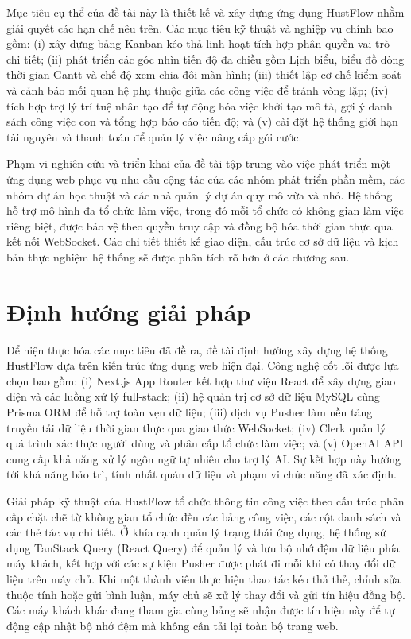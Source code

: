 \documentclass[../DoAn.tex]{subfiles}
\begin{document}
Mục tiêu cụ thể của đề tài này là thiết kế và xây dựng ứng dụng HustFlow nhằm giải quyết các hạn chế nêu trên. Các mục tiêu kỹ thuật và nghiệp vụ chính bao gồm: (i) xây dựng bảng Kanban kéo thả linh hoạt tích hợp phân quyền vai trò chi tiết; (ii) phát triển các góc nhìn tiến độ đa chiều gồm Lịch biểu, biểu đồ dòng thời gian Gantt và chế độ xem chia đôi màn hình; (iii) thiết lập cơ chế kiểm soát và cảnh báo mối quan hệ phụ thuộc giữa các công việc để tránh vòng lặp; (iv) tích hợp trợ lý trí tuệ nhân tạo để tự động hóa việc khởi tạo mô tả, gợi ý danh sách công việc con và tổng hợp báo cáo tiến độ; và (v) cài đặt hệ thống giới hạn tài nguyên và thanh toán để quản lý việc nâng cấp gói cước.

Phạm vi nghiên cứu và triển khai của đề tài tập trung vào việc phát triển một ứng dụng web phục vụ nhu cầu cộng tác của các nhóm phát triển phần mềm, các nhóm dự án học thuật và các nhà quản lý dự án quy mô vừa và nhỏ. Hệ thống hỗ trợ mô hình đa tổ chức làm việc, trong đó mỗi tổ chức có không gian làm việc riêng biệt, được bảo vệ theo quyền truy cập và đồng bộ hóa thời gian thực qua kết nối WebSocket. Các chi tiết thiết kế giao diện, cấu trúc cơ sở dữ liệu và kịch bản thực nghiệm hệ thống sẽ được phân tích rõ hơn ở các chương sau.

\section{Định hướng giải pháp}
\label{section:1.3}

Để hiện thực hóa các mục tiêu đã đề ra, đề tài định hướng xây dựng hệ thống HustFlow dựa trên kiến trúc ứng dụng web hiện đại. Công nghệ cốt lõi được lựa chọn bao gồm: (i) Next.js App Router kết hợp thư viện React để xây dựng giao diện và các luồng xử lý full-stack; (ii) hệ quản trị cơ sở dữ liệu MySQL cùng Prisma ORM để hỗ trợ toàn vẹn dữ liệu; (iii) dịch vụ Pusher làm nền tảng truyền tải dữ liệu thời gian thực qua giao thức WebSocket; (iv) Clerk quản lý quá trình xác thực người dùng và phân cấp tổ chức làm việc; và (v) OpenAI API cung cấp khả năng xử lý ngôn ngữ tự nhiên cho trợ lý AI. Sự kết hợp này hướng tới khả năng bảo trì, tính nhất quán dữ liệu và phạm vi chức năng đã xác định.

Giải pháp kỹ thuật của HustFlow tổ chức thông tin công việc theo cấu trúc phân cấp chặt chẽ từ không gian tổ chức đến các bảng công việc, các cột danh sách và các thẻ tác vụ chi tiết. Ở khía cạnh quản lý trạng thái ứng dụng, hệ thống sử dụng TanStack Query (React Query) \cite{tanstackquery} để quản lý và lưu bộ nhớ đệm dữ liệu phía máy khách, kết hợp với các sự kiện Pusher được phát đi mỗi khi có thay đổi dữ liệu trên máy chủ. Khi một thành viên thực hiện thao tác kéo thả thẻ, chỉnh sửa thuộc tính hoặc gửi bình luận, máy chủ sẽ xử lý thay đổi và gửi tín hiệu đồng bộ. Các máy khách khác đang tham gia cùng bảng sẽ nhận được tín hiệu này để tự động cập nhật bộ nhớ đệm mà không cần tải lại toàn bộ trang web.
\end{document}
